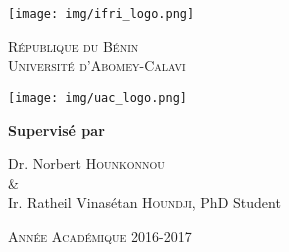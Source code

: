 \documentclass[10pt,a4paper]{article}
\author{Tafsir GNA}
\begin{document}
\setcounter{section}{0}

	\begin{titlepage}
		\centering
		
		\noindent%
		
		\begin{minipage}{.15\linewidth}
			\texttt{[image: img/ifri\_logo.png]}
		\end{minipage}
		\hfill
		\begin{minipage}{.68\linewidth}\centering
			\textsc{République du Bénin}\\
			\vspace*{.5cm}
			\textsc{\Large Université d'Abomey-Calavi}
		\end{minipage}
		\hfill
		\begin{minipage}{.15\linewidth}
			\texttt{[image: img/uac\_logo.png]}
		\end{minipage}
				
		\vspace{1cm}{\scshape\Large Institut de Formation de Recherche en Informatique (IFRI)\par}
		\vspace{1cm}{\scshape\Large Mémoire pour l'obtention du diplôme de Master en Systèmes d'Information et Réseaux Informatiques\par}
		\vspace{1.5cm}{\huge\bfseries Résolution de "Pigment Sequencing Problem" avec les algorithmes génétiques\par}
		\vfill
		\Large\textbf{Supervisé par}\par Dr. Norbert \textsc{Hounkonnou} \\ \& \\ Ir. Ratheil Vinasétan \textsc{Houndji}, PhD Student
		\vfill
		{\large \scshape Année Académique 2016-2017 \par}
	\end{titlepage}

	\tableofcontents
	
	\newpage
	
	\listoffigures
	
	\newpage
	
	\listoftables
	
	\newpage
	
\end{document}
